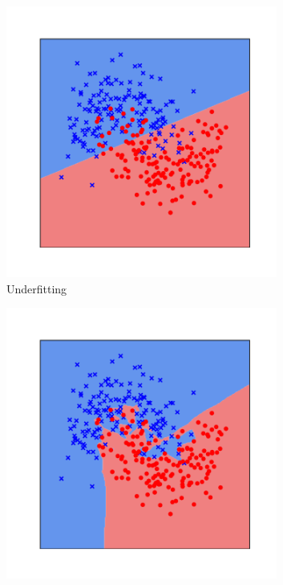 \begin{figure}[h]
  \centering
  \begin{subfigure}[b]{0.32\textwidth}
    \includegraphics[width=0.98\textwidth]{figures/main/ch2-background/underfitting.pdf}
    \caption{Underfitting}
    \label{figure:ch2-fitting_points_a}
  \end{subfigure}
  \hfill
  \begin{subfigure}[b]{0.32\textwidth}
    \includegraphics[width=0.98\textwidth]{figures/main/ch2-background/overfitting.pdf}

\end{subfigure}
\end{figure}
